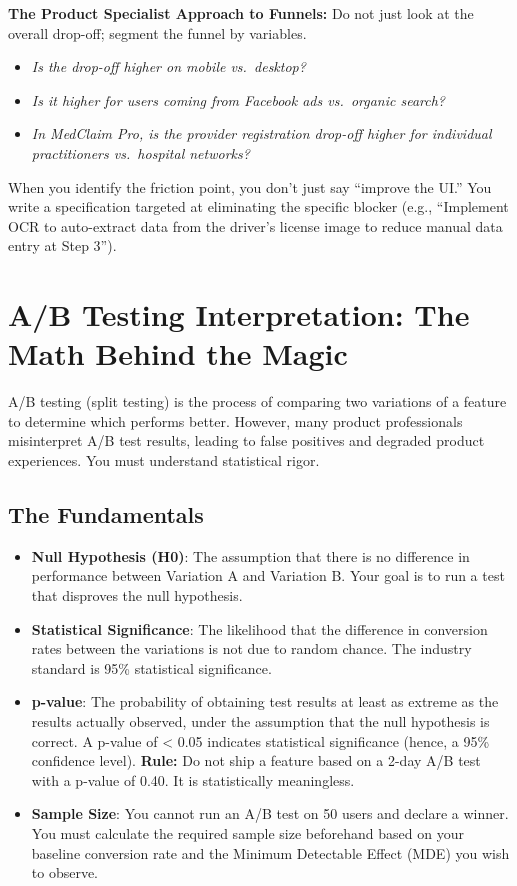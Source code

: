 \textbf{The Product Specialist Approach to Funnels:} Do not just look at
the overall drop-off; segment the funnel by variables.

\begin{itemize}
\tightlist
\item
  \emph{Is the drop-off higher on mobile vs.~desktop?}
\item
  \emph{Is it higher for users coming from Facebook ads vs.~organic
  search?}
\item
  \emph{In MedClaim Pro, is the provider registration drop-off higher
  for individual practitioners vs.~hospital networks?}
\end{itemize}

When you identify the friction point, you don't just say ``improve the
UI.'' You write a specification targeted at eliminating the specific
blocker (e.g., ``Implement OCR to auto-extract data from the driver's
license image to reduce manual data entry at Step 3'').

\bigskip

\section{A/B Testing Interpretation: The Math Behind the
Magic}\label{ab-testing-interpretation-the-math-behind-the-magic}

A/B testing (split testing) is the process of comparing two variations
of a feature to determine which performs better. However, many product
professionals misinterpret A/B test results, leading to false positives
and degraded product experiences. You must understand statistical rigor.

\subsection{The Fundamentals}\label{the-fundamentals}

\begin{itemize}
\tightlist
\item
  \textbf{Null Hypothesis (H0)}: The assumption that there is no
  difference in performance between Variation A and Variation B. Your
  goal is to run a test that disproves the null hypothesis.
\item
  \textbf{Statistical Significance}: The likelihood that the difference
  in conversion rates between the variations is not due to random
  chance. The industry standard is 95\% statistical significance.
\item
  \textbf{p-value}: The probability of obtaining test results at least
  as extreme as the results actually observed, under the assumption that
  the null hypothesis is correct. A p-value of \textless{} 0.05
  indicates statistical significance (hence, a 95\% confidence level).
  \textbf{Rule:} Do not ship a feature based on a 2-day A/B test with a
  p-value of 0.40. It is statistically meaningless.
\item
  \textbf{Sample Size}: You cannot run an A/B test on 50 users and
  declare a winner. You must calculate the required sample size
  beforehand based on your baseline conversion rate and the Minimum
  Detectable Effect (MDE) you wish to observe.
\end{itemize}

